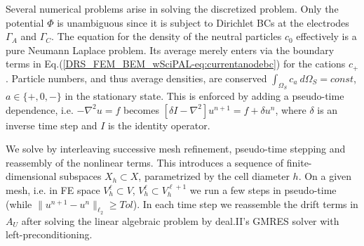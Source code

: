 \documentclass[runningheads]{lncse}
\begin{document}
%
Several numerical problems arise in solving the discretized problem.
%
Only the potential $\Phi$ is unambiguous since it is subject to Dirichlet BCs 
at the electrodes $\Gamma_A$ and $\Gamma_C$.
%
The equation for the density of the neutral particles $c_0$ effectively is a pure Neumann Laplace problem. 
%
Its average merely enters via the boundary terms in Eq.(\ref{DRS_FEM_BEM_wSciPAL-eq:currentanodebc}) for the cations $c_+$.
%
Particle numbers,
and thus average densities,
%
are conserved
$\int_{\Omega_S} c_a ~d \Omega_S  = const$, $a \in \{+,0,-\}$
%
in the stationary state.  %
%
This
is enforced by adding a pseudo-time dependence, i.e.
%
%
$ -\nabla^2u = f  $ becomes $[\delta I -\nabla^2] u^{n+1} = f + \delta u^n$,
%
where
$\delta$ 
is
an inverse time step and $I$ is the identity operator.

We solve by interleaving successive mesh refinement, pseudo-time stepping and reassembly of the nonlinear terms. 
%
This introduces a sequence of finite-dimensional subspaces ${X_h} \subset X$, parametrized by the cell diameter $h$.
%
On a given mesh, i.e. in FE space $V^{\ell}_h \subset V$,  $V^{\ell}_h \subset V^{\ell+1}_h $ we run a few steps in pseudo-time (while $\|u^{n+1} - u^{n} \|_{\ell_2} \ge Tol$).
%
In each time step we reassemble the drift terms in $A_U$ after solving the linear algebraic problem by deal.II's GMRES solver with left-preconditioning.
%
\end{document}
